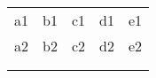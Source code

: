 \documentclass[12pt]{article}
\begin{document}
\begin{table}[]
\begin{tabular}{l|l|l|l|l}
a1 & b1 & c1 & d1 & e1 \\
a2 & b2 & c2 & d2 & e2 \\
   &    &    &    &    \\
   &    &    &    &   
\end{tabular}
\end{table}
\end{document}
